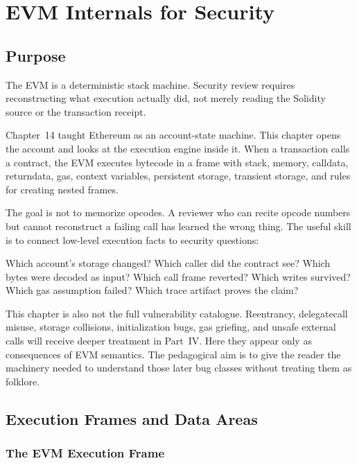 \chapter{EVM Internals for Security}

\section{Purpose}

\begin{principlebox}
The EVM is a deterministic stack machine. Security review requires reconstructing what execution actually did, not merely reading the Solidity source or the transaction receipt.
\end{principlebox}

Chapter~14 taught Ethereum as an account-state machine. This chapter opens the account and looks at the execution engine inside it. When a transaction calls a contract, the EVM executes bytecode in a frame with stack, memory, calldata, returndata, gas, context variables, persistent storage, transient storage, and rules for creating nested frames.

The goal is not to memorize opcodes. A reviewer who can recite opcode numbers but cannot reconstruct a failing call has learned the wrong thing. The useful skill is to connect low-level execution facts to security questions:

\begin{codeblock}
Which account's storage changed?
Which caller did the contract see?
Which bytes were decoded as input?
Which call frame reverted?
Which writes survived?
Which gas assumption failed?
Which trace artifact proves the claim?
\end{codeblock}

This chapter is also not the full vulnerability catalogue. Reentrancy, delegatecall misuse, storage collisions, initialization bugs, gas griefing, and unsafe external calls will receive deeper treatment in Part~IV. Here they appear only as consequences of EVM semantics. The pedagogical aim is to give the reader the machinery needed to understand those later bug classes without treating them as folklore.

\section{Execution Frames and Data Areas}

\subsection{The EVM Execution Frame}

